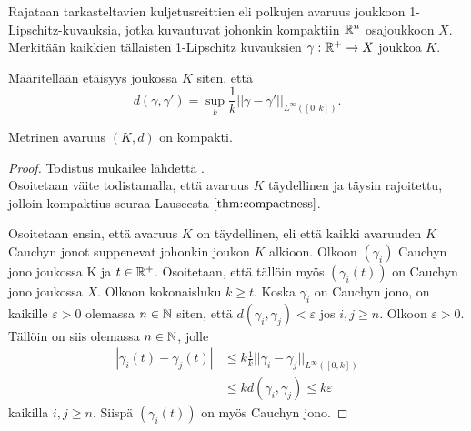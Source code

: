 \documentclass[12pt,oneside,a4paper]{amsbook} %
\begin{document}
Rajataan tarkasteltavien kuljetusreittien eli polkujen avaruus
joukkoon 1-Lipschitz-kuvauksia, jotka kuvautuvat johonkin kompaktiin $\mathbb{R}^n$ osajoukkoon $X$. Merkitään kaikkien tällaisten 1-Lipschitz kuvauksien $\gamma: {\mathbb{R}^{+}} \to X$  joukkoa $K$. 

\begin{definition}
    Määritellään etäisyys joukossa $K$ siten, että
    \[d(\gamma, \gamma') = \sup_k \frac{1}{k}||\gamma - \gamma'||_{L^\infty([0,k])}.\]
\end{definition}

\begin{theorem}\label{le:compactnessOfK}
    Metrinen avaruus $(K, d)$ on kompakti.
\end{theorem}
\begin{proof}
    Todistus mukailee lähdettä \cite[s.26]{optimal}. \\
    Osoitetaan väite todistamalla, että avaruus $K$ täydellinen ja täysin rajoitettu, jolloin kompaktius seuraa Lauseesta $\ref{thm:compactness}$.
    
    Osoitetaan ensin, että avaruus $K$ on täydellinen, eli että kaikki avaruuden $K$ Cauchyn jonot suppenevat johonkin joukon $K$ alkioon. Olkoon $(\gamma_i)$ Cauchyn jono joukossa K ja $t\in {\mathbb{R}^{+}}$. Osoitetaan, että tällöin myös $(\gamma_i(t))$ on Cauchyn jono joukossa $X$. Olkoon kokonaisluku $k \ge t$. Koska $\gamma_i$ on Cauchyn jono, on kaikille $\varepsilon > 0$ olemassa $n \in \mathbb{N}$ siten, että $d(\gamma_i, \gamma_j) < \varepsilon$ jos $i, j \ge n$. Olkoon $\varepsilon > 0$. Tällöin on siis olemassa $n \in \mathbb{N}$, jolle
    \begin{align*}
        |\gamma_i(t)-\gamma_j(t)| &\le k\frac{1}{k} ||\gamma_i - \gamma_j||_{L^\infty{([0,k])}} \\ 
        &\le k d(\gamma_i, \gamma_j) \le k\varepsilon
    \end{align*}
    kaikilla $i, j \ge n$. Siispä $(\gamma_i(t))$ on myös Cauchyn jono.
    

\end{proof}
\end{document}
